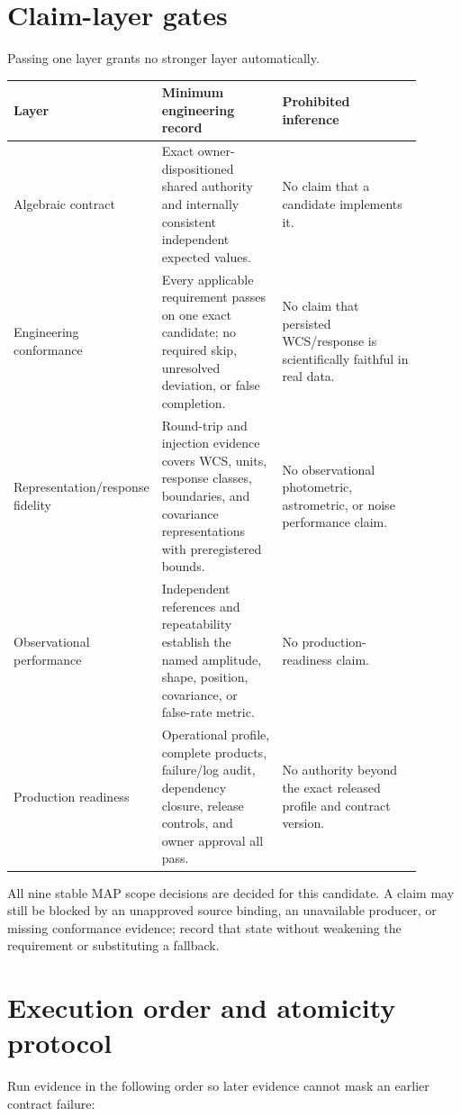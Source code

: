 \documentclass[10pt]{article}
\begin{document}
\section{Claim-layer gates}

Passing one layer grants no stronger layer automatically.

\begin{longtable}{L{0.22\linewidth}L{0.31\linewidth}L{0.37\linewidth}}
\toprule
Layer & Minimum engineering record & Prohibited inference\\
\midrule
Algebraic contract & Exact owner-dispositioned shared authority and internally consistent
independent expected values. & No claim that a candidate implements it.\\
Engineering conformance & Every applicable requirement passes on one exact
candidate; no required skip, unresolved deviation, or false completion. & No
claim that persisted WCS/response is scientifically faithful in real data.\\
Representation/response fidelity & Round-trip and injection evidence covers
WCS, units, response classes, boundaries, and covariance representations with
preregistered bounds. & No observational photometric, astrometric, or noise
performance claim.\\
Observational performance & Independent references and repeatability establish
the named amplitude, shape, position, covariance, or false-rate metric. & No
production-readiness claim.\\
Production readiness & Operational profile, complete products, failure/log
audit, dependency closure, release controls, and owner approval all pass. & No
authority beyond the exact released profile and contract version.\\
\bottomrule
\end{longtable}

All nine stable MAP scope decisions are decided for this candidate.  A claim
may still be blocked by an unapproved source binding, an unavailable producer,
or missing conformance evidence; record that state without weakening the
requirement or substituting a fallback.

\section{Execution order and atomicity protocol}

Run evidence in the following order so later evidence cannot mask an earlier
contract failure:
\end{document}
